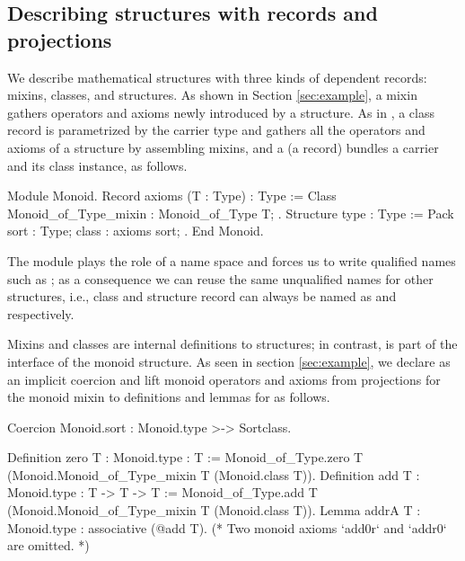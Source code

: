 \documentclass[a4paper,UKenglish,cleveref, autoref]{lipics-v2019}
\newcommand{\mixin}{mixin}
\theoremstyle{implem}
\theoremstyle{implem}
\theoremstyle{command}
\theoremstyle{commands}
\begin{document}
\subsection{Describing structures with records and projections}

We describe mathematical structures with three kinds of dependent records: mixins, classes, and structures.
As shown in Section \ref{sec:example}, a \mixin{} gathers operators and axioms newly introduced by a structure.
As in \cite[Section 2.4]{DBLP:conf/tphol/GarillotGMR09}\cite[Section 2]{KSdraft}, a class record is parametrized by the carrier type  and gathers all the operators and axioms of a structure by assembling mixins, and a  (a record) bundles a carrier and its class instance, as follows.
\begin{coqcode}
Module Monoid.
Record axioms (T : Type) : Type :=
  Class { Monoid_of_Type_mixin : Monoid_of_Type T; }.
Structure type : Type := Pack { sort : Type; class : axioms sort; }.
End Monoid.
\end{coqcode}
The  module plays the role of a name space and forces us to write
qualified names such as ; as a consequence we can reuse the
same unqualified names for other structures, i.e., class and structure record
can always be named as  and  respectively.

Mixins and classes are internal definitions to structures; in contrast,
 is part of the interface of the monoid structure.
As seen in section \ref{sec:example}, we declare  as an
implicit coercion and lift monoid operators and axioms from projections for
the monoid \mixin{} to definitions and lemmas for  as follows.
\begin{coqcode}
Coercion Monoid.sort : Monoid.type >-> Sortclass.

Definition zero {T : Monoid.type} : T :=
  Monoid_of_Type.zero T (Monoid.Monoid_of_Type_mixin T (Monoid.class T)).
Definition add {T : Monoid.type} : T -> T -> T :=
  Monoid_of_Type.add T (Monoid.Monoid_of_Type_mixin T (Monoid.class T)).
Lemma addrA {T : Monoid.type} : associative (@add T).
(* Two monoid axioms `add0r` and `addr0` are omitted. *)
\end{coqcode}
\end{document}
